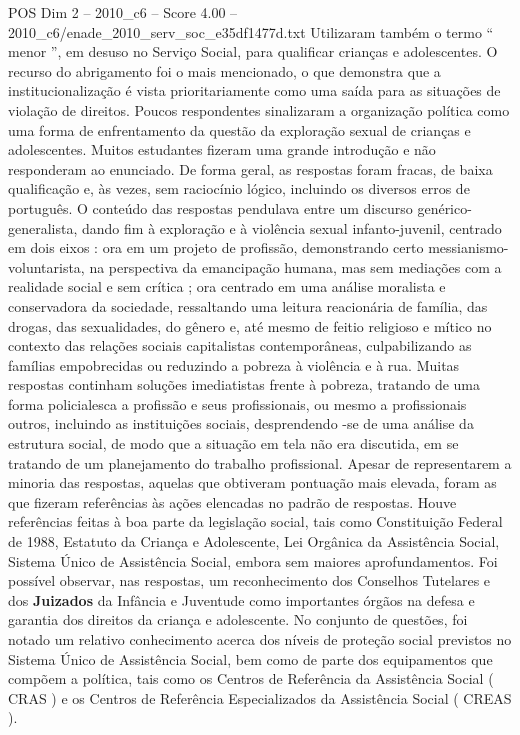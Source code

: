 \begin{textsample}{POS Dim 2 – 2010\_c6 – Score 4.00 – 2010\_c6/enade\_2010\_serv\_soc\_e35df1477d.txt}
Utilizaram também o termo “ menor ”, em desuso no Serviço Social, para qualificar crianças e adolescentes.
O recurso do abrigamento foi o mais mencionado, o que demonstra que a institucionalização é vista prioritariamente como uma saída para as situações de violação de direitos.
Poucos respondentes sinalizaram a organização política como uma forma de enfrentamento da questão da exploração sexual de crianças e adolescentes.
Muitos estudantes fizeram uma grande introdução e não responderam ao enunciado.
De forma geral, as respostas foram fracas, de baixa qualificação e, às vezes, sem raciocínio lógico, incluindo os diversos erros de português.
O conteúdo das respostas pendulava entre um discurso genérico-generalista, dando fim à exploração e à violência sexual infanto-juvenil, centrado em dois eixos : ora em um projeto de profissão, demonstrando certo messianismo-voluntarista, na perspectiva da emancipação humana, mas sem mediações com a realidade social e sem crítica ; ora centrado em uma análise moralista e conservadora da sociedade, ressaltando uma leitura reacionária de família, das drogas, das sexualidades, do gênero e, até mesmo de feitio religioso e mítico no contexto das relações sociais capitalistas contemporâneas, culpabilizando as famílias empobrecidas ou reduzindo a pobreza à violência e à rua.
Muitas respostas continham soluções imediatistas frente à pobreza, tratando de uma forma policialesca a profissão e seus profissionais, ou mesmo a profissionais outros, incluindo as instituições sociais, desprendendo -se de uma análise da estrutura social, de modo que a situação em tela não era discutida, em se tratando de um planejamento do trabalho profissional.
Apesar de representarem a minoria das respostas, aquelas que obtiveram pontuação mais elevada, foram as que fizeram referências às ações elencadas no padrão de respostas.
Houve referências feitas à boa parte da legislação social, tais como Constituição Federal de 1988, Estatuto da Criança e Adolescente, Lei Orgânica da Assistência Social, Sistema Único de Assistência Social, embora sem maiores aprofundamentos.
Foi possível observar, nas respostas, um reconhecimento dos Conselhos Tutelares e dos \textbf{Juizados} da Infância e Juventude como importantes órgãos na defesa e garantia dos direitos da criança e adolescente.
No conjunto de questões, foi notado um relativo conhecimento acerca dos níveis de proteção social previstos no Sistema Único de Assistência Social, bem como de parte dos equipamentos que compõem a política, tais como os Centros de Referência da Assistência Social ( CRAS ) e os Centros de Referência Especializados da Assistência Social ( CREAS ).

\end{textsample}
